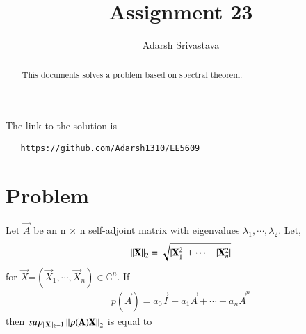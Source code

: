 \documentclass[journal,12pt,twocolumn]{IEEEtran}
\begin{document}
       \def\rightbox#1{\makebox[0in][r]{#1}}
       \def\centbox#1{\makebox[0in]{#1}}
       \def\topbox#1{\raisebox{-\baselineskip}[0in][0in]{#1}}
       \def\midbox#1{\raisebox{-0.5\baselineskip}[0in][0in]{#1}}
  \vspace{3cm}
  \title{Assignment 23}
  \author{Adarsh Srivastava}
  \maketitle
  \newpage
  \bigskip
  \renewcommand{\thetable}{\theenumi}
  The link to the solution is
  \begin{lstlisting}
   https://github.com/Adarsh1310/EE5609
  \end{lstlisting}
  \begin{abstract}
  This documents solves a problem based on spectral theorem.
  \end{abstract}
\section{\textbf{Problem}}
Let $\vec{A}$ be an n $\times$ n self-adjoint matrix with eigenvalues $\lambda_1, \cdots, \lambda_2$.
Let,\begin{align*} \left\lVert\mathbf{X}\right\rVert_2=\sqrt{\vert\mathbf{X}_{1}^{2}\vert+\cdots+\vert\mathbf{X}_{n}^{2}\vert}\end{align*} for $\vec{X}$=$(\vec{X}_{1},\cdots,\vec{X}_{n})\in \mathbb{C}^n$. If \begin{align*}
p(\vec{A})=a_0\vec{I}+a_1\vec{A}+\cdots+a_n\vec{A}^n
\end{align*}
then $sup_{\left\lVert\mathbf{X}\right\rVert_{2}=1}\left\lVert p(\mathbf{A})\mathbf{X}\right\rVert_2$ is equal to
\end{document}
